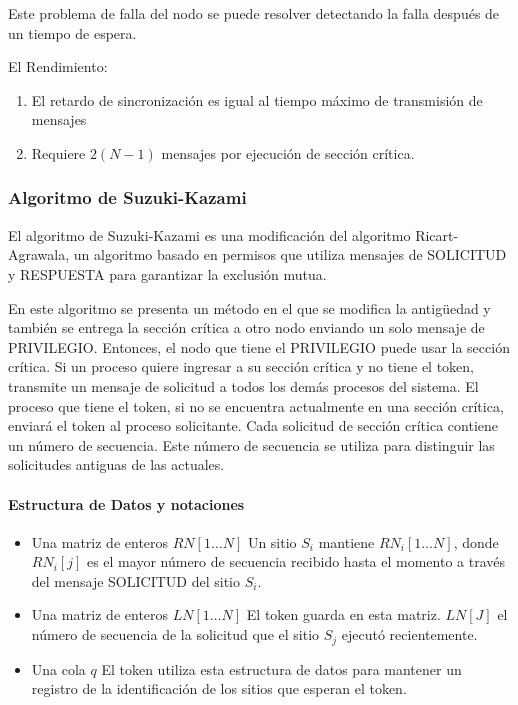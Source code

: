 {Este  problema de falla del nodo se puede 	resolver detectando la falla después de un 	tiempo de espera.

El Rendimiento:
	\begin{enumerate}
		\item El retardo de sincronización es igual al
		tiempo máximo de transmisión de mensajes
		
		\item 	Requiere $2 (N - 1)$ mensajes por ejecución
		de sección crítica.
	\end{enumerate}
	
	\subsubsection{Algoritmo de Suzuki-Kazami}
	
	El algoritmo de Suzuki-Kazami \cite{Suzuki1985} es una modificación del algoritmo Ricart-Agrawala, un algoritmo basado en permisos   que utiliza mensajes de SOLICITUD y RESPUESTA para garantizar la exclusión mutua.
	
	En este algoritmo se presenta un método en el que se modifica la antigüedad y también se entrega la sección crítica a otro nodo enviando un solo mensaje de PRIVILEGIO. Entonces, el nodo que tiene el PRIVILEGIO puede usar la sección crítica. Si un proceso quiere ingresar a su sección crítica y no tiene el token, transmite un mensaje de solicitud a todos los demás procesos del sistema. El proceso que tiene el token, si no se encuentra actualmente en una sección crítica, enviará el token al proceso solicitante. 	Cada solicitud de sección crítica contiene un número de secuencia. Este número de secuencia se utiliza para distinguir las solicitudes antiguas de las actuales.
	
	\paragraph{Estructura de Datos y notaciones}
	\begin{itemize}
		\item 	Una matriz de enteros $RN[1…N]$
		Un sitio $S_{i}$ mantiene $RN_{i}[1…N]$, donde $RN_{i}[j]$ es el mayor número de secuencia recibido hasta el momento a través del mensaje SOLICITUD del sitio $S_{i}$.
		\item Una matriz de enteros $LN[1…N]$
		El token guarda en esta matriz. $LN[J]$ el número de secuencia de la solicitud que el sitio $S_{j}$ ejecutó recientemente.
		\item Una cola $q$
		El token utiliza esta estructura de datos para mantener un registro de la identificación de los sitios que esperan el token.
	\end{itemize}
	
}

